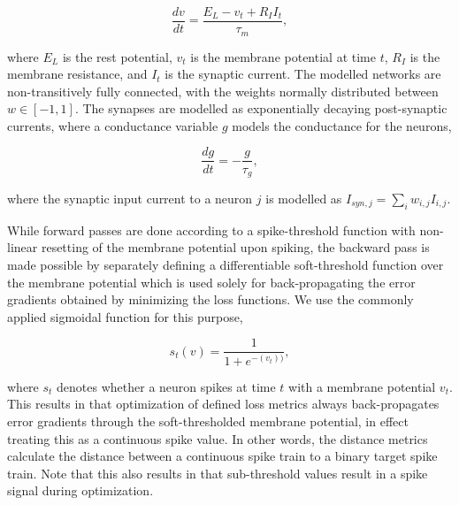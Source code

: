 \documentclass[mphil,deptreport,ianc]{infthesis} %
\begin{document}
\begin{equation}
    \frac{dv}{dt} = \frac{E_L - v_t + R_I I_t}{\tau_m},
\end{equation}

where $E_L$ is the rest potential, $v_t$ is the membrane potential at time $t$, $R_I$ is the membrane resistance, and $I_t$ is the synaptic current.
The modelled networks are non-transitively fully connected, with the weights normally distributed between $w \in [-1, 1]$. The synapses are modelled as exponentially decaying post-synaptic currents, where a conductance variable $g$ models the conductance for the neurons,

\begin{equation}
    \frac{dg}{dt} = -\frac{g}{\tau_g},
\end{equation}

where the synaptic input current to a neuron $j$ is modelled as $I_{syn,j} = \sum_{i} w_{i,j} I_{i,j}$.

While forward passes are done according to a spike-threshold function with non-linear resetting of the membrane potential upon spiking, the backward pass is made possible by separately defining a differentiable soft-threshold function over the membrane potential which is used solely for back-propagating the error gradients obtained by minimizing the loss functions. We use the commonly applied sigmoidal function for this purpose,

\begin{equation}
    s_t(v) = \frac{1}{1+e^{-(v_t))}},
\end{equation}

where $s_t$ denotes whether a neuron spikes at time $t$ with a membrane potential $v_t$.
This results in that optimization of defined loss metrics always back-propagates error gradients through the soft-thresholded membrane potential, in effect treating this as a continuous spike value. 
In other words, the distance metrics calculate the distance between a continuous spike train to a binary target spike train.
Note that this also results in that sub-threshold values result in a spike signal during optimization.

\end{document}
